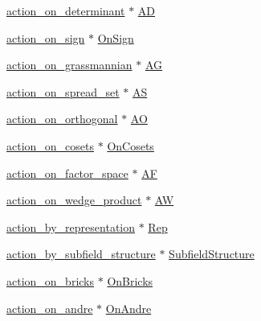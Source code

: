 \begin{DoxyCompactItemize}
\item 
\mbox{\hyperlink{classaction__on__determinant}{action\+\_\+on\+\_\+determinant}} $\ast$ \mbox{\hyperlink{unionsymmetry__group_a3dea996d9e2207ac51cc5930dba87783}{AD}}
\item 
\mbox{\hyperlink{classaction__on__sign}{action\+\_\+on\+\_\+sign}} $\ast$ \mbox{\hyperlink{unionsymmetry__group_a8d4447e3d581992d2692a111fd466f34}{On\+Sign}}
\item 
\mbox{\hyperlink{classaction__on__grassmannian}{action\+\_\+on\+\_\+grassmannian}} $\ast$ \mbox{\hyperlink{unionsymmetry__group_a02855d06758510a5ee5be216af7306fc}{AG}}
\item 
\mbox{\hyperlink{classaction__on__spread__set}{action\+\_\+on\+\_\+spread\+\_\+set}} $\ast$ \mbox{\hyperlink{unionsymmetry__group_a893988c795fd8e3507bc49c9dc5e1342}{AS}}
\item 
\mbox{\hyperlink{classaction__on__orthogonal}{action\+\_\+on\+\_\+orthogonal}} $\ast$ \mbox{\hyperlink{unionsymmetry__group_a499e31ac2b9c85f682ef5cfdee082727}{AO}}
\item 
\mbox{\hyperlink{classaction__on__cosets}{action\+\_\+on\+\_\+cosets}} $\ast$ \mbox{\hyperlink{unionsymmetry__group_aa244b2a37456623d86a8b99031a01b05}{On\+Cosets}}
\item 
\mbox{\hyperlink{classaction__on__factor__space}{action\+\_\+on\+\_\+factor\+\_\+space}} $\ast$ \mbox{\hyperlink{unionsymmetry__group_a8852b3bde68acb310f75b5ef6d48e256}{AF}}
\item 
\mbox{\hyperlink{classaction__on__wedge__product}{action\+\_\+on\+\_\+wedge\+\_\+product}} $\ast$ \mbox{\hyperlink{unionsymmetry__group_abf8fcb026648b8496295db8de687467e}{AW}}
\item 
\mbox{\hyperlink{classaction__by__representation}{action\+\_\+by\+\_\+representation}} $\ast$ \mbox{\hyperlink{unionsymmetry__group_a00c94e782c17dd0bf0ab54e157c4fb6b}{Rep}}
\item 
\mbox{\hyperlink{classaction__by__subfield__structure}{action\+\_\+by\+\_\+subfield\+\_\+structure}} $\ast$ \mbox{\hyperlink{unionsymmetry__group_afc407ffaf00f69a548e568bb4275a48c}{Subfield\+Structure}}
\item 
\mbox{\hyperlink{classaction__on__bricks}{action\+\_\+on\+\_\+bricks}} $\ast$ \mbox{\hyperlink{unionsymmetry__group_a8ff2be5e6561dc91d3fd99fe231829fe}{On\+Bricks}}
\item 
\mbox{\hyperlink{classaction__on__andre}{action\+\_\+on\+\_\+andre}} $\ast$ \mbox{\hyperlink{unionsymmetry__group_a586917bb6f0bd4db13127b4eb06d57dc}{On\+Andre}}

\end{DoxyCompactItemize}
